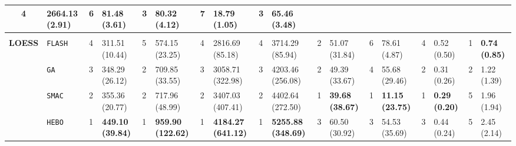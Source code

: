 \begin{tabular}{clllllllllllllllll}
  4 &
  \multicolumn{1}{l|}{2664.13 (2.91)} &
  6 &
  \multicolumn{1}{l|}{81.48 (3.61)} &
  3 &
  \multicolumn{1}{l|}{80.32 (4.12)} &
  7 &
  \multicolumn{1}{l|}{18.79 (1.05)} &
  3 &
  65.46 (3.48) \\
\hline
\multicolumn{1}{l}{\textbf{}} &
    &
    &
    &
    &
    &
    &
    &
    &
    &
    &
    &
    &
    &
    &
    &
    &
    \\ \hline
\multicolumn{1}{c|}{\multirow{9}{*}{\textbf{LOESS}}} &
  \multicolumn{1}{l|}{\texttt{FLASH}} &
  4 &
  \multicolumn{1}{l|}{311.51 (10.44)} &
  5 &
  \multicolumn{1}{l|}{574.15 (23.25)} &
  4 &
  \multicolumn{1}{l|}{2816.69 (85.18)} &
  4 &
  \multicolumn{1}{l|}{3714.29 (85.94)} &
  2 &
  \multicolumn{1}{l|}{51.07 (31.84)} &
  6 &
  \multicolumn{1}{l|}{78.61 (4.87)} &
  4 &
  \multicolumn{1}{l|}{0.52 (0.50)} &
  \cellcolor{blue!15}1 &
  \cellcolor{blue!15}\textbf{0.74 (0.85)} \\
\multicolumn{1}{c|}{} &
  \multicolumn{1}{l|}{\texttt{GA}} &
  3 &
  \multicolumn{1}{l|}{348.29 (26.12)} &
  2 &
  \multicolumn{1}{l|}{709.85 (33.55)} &
  3 &
  \multicolumn{1}{l|}{3058.71 (322.98)} &
  3 &
  \multicolumn{1}{l|}{4203.46 (256.08)} &
  2 &
  \multicolumn{1}{l|}{49.39 (33.67)} &
  4 &
  \multicolumn{1}{l|}{55.68 (29.46)} &
  2 &
  \multicolumn{1}{l|}{0.31 (0.26)} &
  2 &
  1.22 (1.39) \\
\multicolumn{1}{c|}{} &
  \multicolumn{1}{l|}{\texttt{SMAC}} &
  2 &
  \multicolumn{1}{l|}{355.36 (20.77)} &
  2 &
  \multicolumn{1}{l|}{717.96 (48.99)} &
  2 &
  \multicolumn{1}{l|}{3407.03 (407.41)} &
  2 &
  \multicolumn{1}{l|}{4402.64 (272.50)} &
  \cellcolor{blue!15}1 &
  \multicolumn{1}{l|}{\cellcolor{blue!15}\textbf{39.68 (38.67)}} &
  \cellcolor{blue!15}1 &
  \multicolumn{1}{l|}{\cellcolor{blue!15}\textbf{11.15 (23.75)}} &
  \cellcolor{blue!15}1 &
  \multicolumn{1}{l|}{\cellcolor{blue!15}\textbf{0.29 (0.20)}} &
  5 &
  1.96 (1.94) \\
\multicolumn{1}{c|}{} &
  \multicolumn{1}{l|}{\texttt{HEBO}} &
  \cellcolor{blue!15}1 &
  \multicolumn{1}{l|}{\cellcolor{blue!15}\textbf{449.10 (39.84)}} &
  \cellcolor{blue!15}1 &
  \multicolumn{1}{l|}{\cellcolor{blue!15}\textbf{959.90 (122.62)}} &
  \cellcolor{blue!15}1 &
  \multicolumn{1}{l|}{\cellcolor{blue!15}\textbf{4184.27 (641.12)}} &
  \cellcolor{blue!15}1 &
  \multicolumn{1}{l|}{\cellcolor{blue!15}\textbf{5255.88 (348.69)}} &
  3 &
  \multicolumn{1}{l|}{60.50 (30.92)} &
  3 &
  \multicolumn{1}{l|}{54.53 (35.69)} &
  3 &
  \multicolumn{1}{l|}{0.44 (0.24)} &
  5 &
  2.45 (2.14) \\

\end{tabular}
